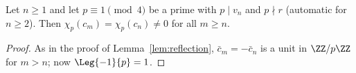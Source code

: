 \begin{lemma}
  \label{lem:reflection-one}
  \leanok
  Let $n \ge 1$ and let $p \equiv 1 \pmod 4$ be a prime with $p \mid v_n$ and $p \nmid r$ (automatic
  for $n \ge 2$). Then $\chi_p(c_m) = \chi_p(c_n) \ne 0$ for all $m \ge n$.
\end{lemma}
\begin{proof}
  \leanok
  As in the proof of Lemma~\ref{lem:reflection}, $\bar c_m = -\bar c_n$ is a unit in $\ZZ/p\ZZ$ for
  $m > n$; now $\Leg{-1}{p} = 1$.
\end{proof}

